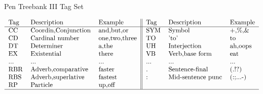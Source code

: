 \begin {table}[h]
\caption {Pen Treebank III Tag Set} \label{tab:title} 
\[\begin{tabular}{lll||lll}
  Tag & Description         & Example       & Tag & Description         & Example\\
  \hline                        
  CC  & Coordin,Conjunction & and,but,or    & SYM & Symbol              & +,\%,\&\\
  CD  & Cardinal number     & one,two,three & TO  & 'to'                & to\\
  DT  & Determiner          & a,the         & UH  & Interjection        & ah,oops\\
  EX  & Existential         & there         & VB  & Verb,base form      & eat\\
  ... & ...                 & ...           & ... & ...                 & ...\\
  RBR & Adverb,comparative  & faster        & .   & Sentence-final      & (.!?)\\
  RBS & Adverb,superlative  & fastest       & :   & Mid-sentence punc   & (:;...-)\\
  RP  & Particle            & up,off        &     &                     &\\
  \hline  
\end{tabular}\]
\end{table}


